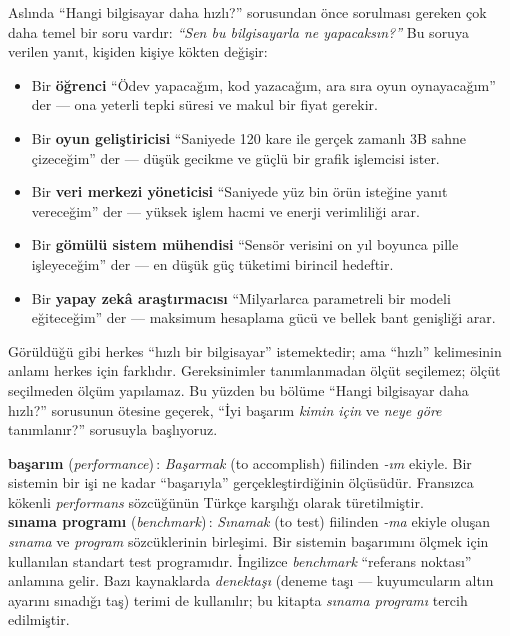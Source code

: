 Aslında ``Hangi bilgisayar daha hızlı?'' sorusundan önce sorulması gereken çok daha temel bir soru vardır: \emph{``Sen bu bilgisayarla ne yapacaksın?''} Bu soruya verilen yanıt, kişiden kişiye kökten değişir:
\begin{itemize}[nosep]
    \item Bir \textbf{öğrenci} ``Ödev yapacağım, kod yazacağım, ara sıra oyun oynayacağım'' der --- ona yeterli tepki süresi ve makul bir fiyat gerekir.
    \item Bir \textbf{oyun geliştiricisi} ``Saniyede 120 kare ile gerçek zamanlı 3B sahne çizeceğim'' der --- düşük gecikme ve güçlü bir grafik işlemcisi ister.
    \item Bir \textbf{veri merkezi yöneticisi} ``Saniyede yüz bin örün isteğine yanıt vereceğim'' der --- yüksek işlem hacmi ve enerji verimliliği arar.
    \item Bir \textbf{gömülü sistem mühendisi} ``Sensör verisini on yıl boyunca pille işleyeceğim'' der --- en düşük güç tüketimi birincil hedeftir.
    \item Bir \textbf{yapay zekâ araştırmacısı} ``Milyarlarca parametreli bir modeli eğiteceğim'' der --- maksimum hesaplama gücü ve bellek bant genişliği arar.
\end{itemize}
Görüldüğü gibi herkes ``hızlı bir bilgisayar'' istemektedir; ama ``hızlı'' kelimesinin anlamı herkes için farklıdır. Gereksinimler tanımlanmadan ölçüt seçilemez; ölçüt seçilmeden ölçüm yapılamaz. Bu yüzden bu bölüme ``Hangi bilgisayar daha hızlı?'' sorusunun ötesine geçerek, ``İyi başarım \emph{kimin için} ve \emph{neye göre} tanımlanır?'' sorusuyla başlıyoruz.

\begin{terimnotu}
\textbf{başarım} (\emph{performance})\,: \emph{Başarmak} (to accomplish) fiilinden \emph{-ım} ekiyle. Bir sistemin bir işi ne kadar ``başarıyla'' gerçekleştirdiğinin ölçüsüdür. Fransızca kökenli \emph{performans} sözcüğünün Türkçe karşılığı olarak türetilmiştir.\\[4pt]
\textbf{sınama programı} (\emph{benchmark})\,: \emph{Sınamak} (to test) fiilinden \emph{-ma} ekiyle oluşan \emph{sınama} ve \emph{program} sözcüklerinin birleşimi. Bir sistemin başarımını ölçmek için kullanılan standart test programıdır. İngilizce \emph{benchmark} ``referans noktası'' anlamına gelir. Bazı kaynaklarda \emph{denektaşı} (deneme taşı --- kuyumcuların altın ayarını sınadığı taş) terimi de kullanılır; bu kitapta \emph{sınama programı} tercih edilmiştir.
\end{terimnotu}

